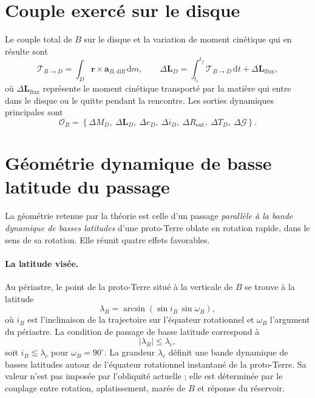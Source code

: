 \documentclass[11pt,a4paper,openany]{report}
\newcommand{\dd}{\mathrm{d}}
\begin{document}
\section{Couple exercé sur le disque}

Le couple total de $B$ sur le disque et la variation de moment cinétique qui en résulte sont
\begin{equation}
\boldsymbol{\mathcal{T}}_{B\to D}=\int_D\mathbf{r}\times\mathbf{a}_{B,\mathrm{diff}}\,\dd m,
\qquad
\Delta\mathbf{L}_D=\int_{t_i}^{t_f}\boldsymbol{\mathcal{T}}_{B\to D}\,\dd t+\Delta\mathbf{L}_{\mathrm{flux}},
\label{eq:couple}
\end{equation}
où $\Delta\mathbf{L}_{\mathrm{flux}}$ représente le moment cinétique transporté par la matière
qui entre dans le disque ou le quitte pendant la rencontre. Les sorties dynamiques principales
sont
\begin{equation}
\mathcal{O}_B=\left\{\Delta M_D,\ \Delta\mathbf{L}_D,\ \Delta e_D,\ \Delta i_D,\
\Delta R_{\mathrm{out}},\ \Delta T_D,\ \Delta\mathcal{G}\right\}.
\label{eq:OB}
\end{equation}


\section{Géométrie dynamique de basse latitude du passage}
\label{sec:basse-latitude}

La géométrie retenue par la théorie est celle d'un passage \emph{parallèle à la bande
dynamique de basses latitudes} d'une proto-Terre oblate en rotation rapide, dans le sens de sa rotation. Elle
réunit quatre effets favorables.

\paragraph{La latitude visée.}
Au périastre, le point de la proto-Terre situé à la verticale de $B$ se trouve à la latitude
\begin{equation}
\lambda_B=\arcsin\left(\sin i_B\,\sin\omega_B\right),
\label{eq:lambdaB}
\end{equation}
où $i_B$ est l'inclinaison de la trajectoire sur l'équateur rotationnel et $\omega_B$ l'argument
du périastre. La condition de passage de basse latitude correspond à
\begin{equation}
|\lambda_B|\le\lambda_c,
\label{eq:basse-latitude}
\end{equation}
soit $i_B\lesssim\lambda_c$ pour $\omega_B=90^\circ$. La grandeur $\lambda_c$ définit une bande
dynamique de basses latitudes autour de l'équateur rotationnel instantané de la proto-Terre. Sa
valeur n'est pas imposée par l'obliquité actuelle ; elle est déterminée par le couplage entre
rotation, aplatissement, marée de $B$ et réponse du réservoir.
\end{document}
